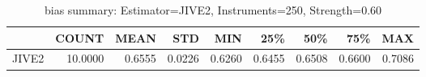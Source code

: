 \begin{table}[ht]
\centering
\caption{bias summary: Estimator=JIVE2, Instruments=250, Strength=0.60}
\begin{tabular}{lrrrrrrrr}
\toprule
 & COUNT & MEAN & STD & MIN & 25\% & 50\% & 75\% & MAX \\
\midrule
JIVE2 & 10.0000 & 0.6555 & 0.0226 & 0.6260 & 0.6455 & 0.6508 & 0.6600 & 0.7086 \\
\bottomrule
\end{tabular}
\end{table}
